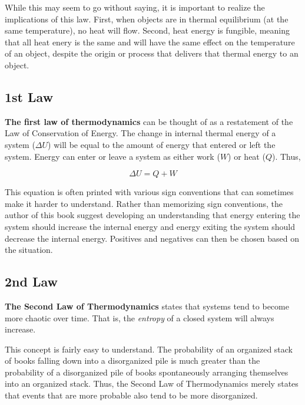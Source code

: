 	While this may seem to go without saying, it is important to realize the implications of this law.  First, when objects are in thermal equilibrium (at the same temperature), no heat will flow.  Second, heat energy is fungible, meaning that all heat enery is the same and will have the same effect on the temperature of an object, despite the origin or process that delivers that thermal energy to an object.
	
	\subsection{1st Law}
		
		\textbf{The first law of thermodynamics} can be thought of as a restatement of the Law of Conservation of Energy. The change in internal thermal energy of a system ($\Delta U$) will be equal to the amount of energy that entered or left the system.  Energy can enter or leave a system as either work ($W$) or heat ($Q$).  Thus,
		
		\begin{mdframed}[backgroundcolor=orange!20!white]
		\begin{equation}
				\Delta U = Q + W
				\label{eqn:firstlawofthermo}
		\end{equation}
		\end{mdframed}
			
This equation is often printed with various sign conventions that can sometimes make it harder to understand.  Rather than memorizing sign conventions, the author of this book suggest developing an understanding that energy entering the system should increase the internal energy and energy exiting the system should decrease the internal energy.  Positives and negatives can then be chosen based on the situation.  

	
	\subsection{2nd Law} 
			\textbf{The Second Law of Thermodynamics} states that systems tend to become more chaotic over time.  That is, the \textit{entropy} of a closed system will always increase.  
			
			This concept is fairly easy to understand.  The probability of an organized stack of books falling down into a disorganized pile is much greater than the probability of a disorganized pile of books spontaneously arranging themselves into an organized stack.  Thus, the Second Law of Thermodynamics merely states that events that are more probable also tend to be more disorganized.  
			
